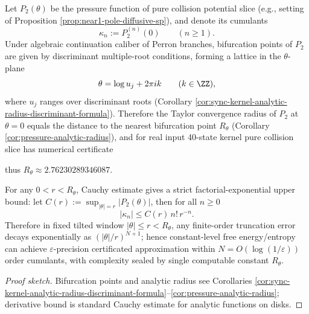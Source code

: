 \begin{conclusion}\label{con:xi-terminal-pressure-analytic-radius-cumulant-bound}
Let \(P_2(\theta)\) be the pressure function of pure collision potential slice (e.g., setting of Proposition \ref{prop:near1-pole-diffusive-sp}), and denote its cumulants
\[
\kappa_n:=P_2^{(n)}(0)\qquad(n\ge 1).
\]
Under algebraic continuation caliber of Perron branches, bifurcation points of \(P_2\) are given by discriminant multiple-root conditions, forming a lattice in the \(\theta\)-plane
\[
\theta=\log u_j+2\pi i k\qquad(k\in\ZZ),
\]
where \(u_j\) ranges over discriminant roots (Corollary \ref{cor:sync-kernel-analytic-radius-discriminant-formula}).
Therefore the Taylor convergence radius of \(P_2\) at \(\theta=0\) equals the distance to the nearest bifurcation point \(R_\theta\) (Corollary \ref{cor:pressure-analytic-radius}), and for real input 40-state kernel pure collision slice has numerical certificate

thus \(R_\theta\approx 2.76230289346087\).
\par
For any \(0<r<R_\theta\), Cauchy estimate gives a strict factorial-exponential upper bound: let
\(
C(r):=\sup_{|\theta|=r}|P_2(\theta)|
\), then for all \(n\ge 0\)
\[
\boxed{\;
|\kappa_n|\le C(r)\,n!\,r^{-n}.\;}
\]
Therefore in fixed tilted window \(|\theta|\le r<R_\theta\), any finite-order truncation error decays exponentially as \((|\theta|/r)^{N+1}\);
hence constant-level free energy/entropy can achieve \(\varepsilon\)-precision certificated approximation within \(N=O(\log(1/\varepsilon))\) order cumulants, with complexity sealed by single computable constant \(R_\theta\).
\end{conclusion}
\begin{proof}[Proof sketch]
Bifurcation points and analytic radius see Corollaries \ref{cor:sync-kernel-analytic-radius-discriminant-formula}--\ref{cor:pressure-analytic-radius};
derivative bound is standard Cauchy estimate for analytic functions on disks.
\end{proof}

